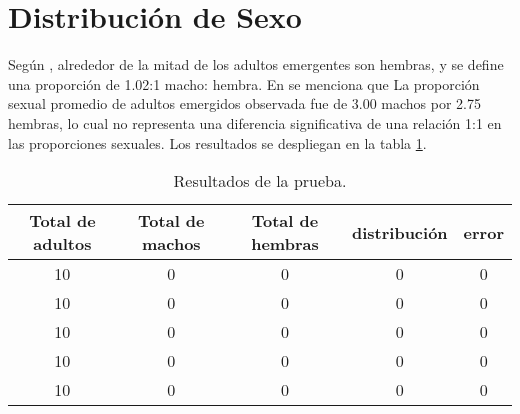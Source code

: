 \section{Distribución de Sexo}
Según \cite{otero2006stochastic}, alrededor de la mitad de los adultos emergentes son hembras, 
y se define una proporción de 1.02:1 macho: hembra. En \cite{manrique1998desarrollo} se menciona que
La proporción sexual promedio de adultos emergidos observada fue de 3.00 machos por 2.75 hembras, lo cual
no representa una diferencia significativa de una relación 1:1 en las proporciones sexuales. Los
 resultados se despliegan en la tabla \ref{tab:distribucion-sexo-test}.

\begin{table}
\begin{tabular}{c c c c c }
Total de adultos & Total de machos & Total de hembras & distribución & error\\
\hline
10  & 0  & 0 & 0 & 0   \\
10  & 0  & 0 & 0 & 0   \\
10  & 0  & 0 & 0 & 0   \\
10  & 0  & 0 & 0 & 0   \\
10  & 0  & 0 & 0 & 0   \\
\end{tabular}
\caption{ \label{tab:distribucion-sexo-test} Resultados de la prueba.}
\end{table}
